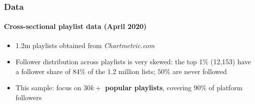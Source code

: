 \documentclass[8pt]{beamer}
\begin{document}

\begin{frame}[label=shortversion]

\frametitle{Data}
\framesubtitle{Cross-sectional playlist data (April 2020)}

\begin{itemize}
	
	\item 1.2m playlists obtained from \textit{Chartmetric.com}
	\item Follower distribution across playlists is very skewed: the top 1\% (12,153) have a follower share of 84\% of the 1.2 million lists; $50\%$ are never followed
	\item This sample: focus on \textbf{$30k+$ popular playlists}, covering \textbf{$90\%$} of platform followers
\end{itemize}
	\vspace{-.2cm}


\end{frame}


\end{document}
